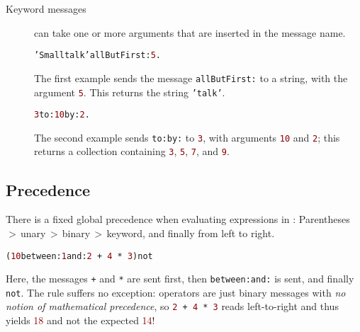\begin{description}
\item[Keyword messages] can take one or more arguments that are inserted in the message name.

\begin{alltt}
\textcolor{string}{'Smalltalk'} allButFirst: \textcolor{darkRed}{5}.
\end{alltt}

The first example sends the message \texttt{allButFirst:} to a string, with the argument \textcolor{darkRed}{\texttt{5}}.
This returns the string \textcolor{string}{\texttt{'talk'}}.

\begin{alltt}
\textcolor{darkRed}{3} to: \textcolor{darkRed}{10} by: \textcolor{darkRed}{2}.
\end{alltt}

The second example sends \texttt{to:by:} to \textcolor{darkRed}{\texttt{3}}, with arguments \textcolor{darkRed}{\texttt{10}} and \textcolor{darkRed}{\texttt{2}}; this returns a collection containing \textcolor{darkRed}{\texttt{3}}, \textcolor{darkRed}{\texttt{5}}, \textcolor{darkRed}{\texttt{7}}, and \textcolor{darkRed}{\texttt{9}}.

\end{description}


\subsection{Precedence}

There is a fixed global precedence when evaluating expressions in \PH: Parentheses\,$>$\,unary\,$>$\,binary\,$>$\,keyword, and finally from left to right.

\begin{alltt}
(\textcolor{darkRed}{10} between: \textcolor{darkRed}{1} and: \textcolor{darkRed}{2}\,+\,\textcolor{darkRed}{4}\,*\,\textcolor{darkRed}{3}) not
\end{alltt}

Here, the messages \texttt{+} and \texttt{*} are sent first, then \texttt{between:and:} is sent, and finally \texttt{not}.
The rule suffers no exception: operators are just binary messages with \emph{no notion of mathematical precedence}, so \texttt{\textcolor{darkRed}{2}\,+\,\textcolor{darkRed}{4}\,*\,\textcolor{darkRed}{3}} reads left-to-right and thus yields \textcolor{darkRed}{18} and not the expected \textcolor{darkRed}{14}!

